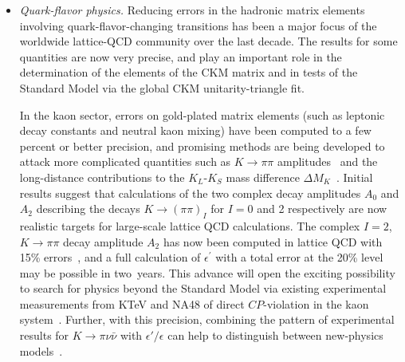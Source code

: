 \begin{itemize}

\item {\it Quark-flavor physics.} Reducing errors in the hadronic matrix elements involving quark-flavor-changing transitions has been a major focus
of the worldwide lattice-QCD community over the last decade.  The results for some quantities are now very precise, and play an important role in the determination of
the elements of the CKM matrix and in tests of the Standard Model via the global CKM unitarity-triangle fit.

In the kaon sector, errors on gold-plated matrix elements (such as leptonic decay constants and neutral kaon mixing) have been computed to a few percent or better precision, and promising methods are being developed to attack more complicated quantities such as $K\to\pi\pi$ amplitudes~\cite{Blum:2011pu,Blum:2011ng,Blum:2012uk} and the long-distance contributions to the $K_L$-$K_S$ mass difference $\Delta M_K$~\cite{Yu:2011np,Christ:2012se}.  Initial results suggest that calculations of the two complex decay amplitudes $A_0$ and $A_2$ describing the decays $K\to(\pi\pi)_I$ for $I=0$ and 2 respectively are now realistic targets for large-scale lattice QCD
calculations.  The complex $I=2$, $K\to\pi\pi$ decay amplitude $A_2$ has now been computed in lattice QCD with 15\%
errors~\cite{Blum:2011ng,Blum:2012uk}, and a full calculation of $\epsilon^\prime$ with a total error at the 20\% level may be possible in 
two~years.  This advance will open the exciting possibility to search for physics beyond the Standard Model via existing experimental measurements from KTeV and NA48 of direct
$CP$-violation in the kaon system~\cite{Batley:2002gn,Abouzaid:2010ny}.  Further, with this precision, combining the pattern of experimental results for $K\to\pi\nu\bar\nu$ with
$\epsilon'/\epsilon$ can help to distinguish between new-physics models~\cite{Buras:1999da,Kronfeld:2013uoa}.  


\end{itemize}
